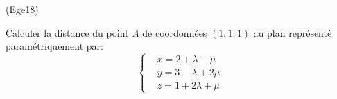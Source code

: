 \begin{tiny}(Ege18)\end{tiny} Calculer la distance du point $A$ de coordonnées $(1,1,1)$ au plan représenté paramétriquement par:
\begin{displaymath}
 \left\lbrace 
\begin{aligned}
 &x = 2+\lambda - \mu \\
 &y = 3-\lambda +2\mu \\
 &z = 1+2\lambda +\mu
\end{aligned}
\right.
\end{displaymath}